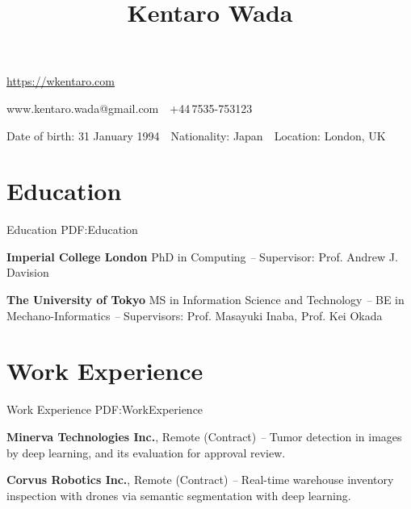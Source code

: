 \documentclass[letterpaper,MMMyyyy,nonstop]{simpleresumecv}
\newcommand{\CVAuthor}{Kentaro Wada}
\newcommand{\CVWebpage}{\href{https://wkentaro.com}{\underline{https://wkentaro.com}}}
\begin{document}

\title{\CVAuthor}

\begin{subtitle}
\CVWebpage
\par
www.kentaro.wada@gmail.com
\,\SubBulletSymbol\,
+44\,7535-753123
\par
Date of birth: 31 January 1994
\,\SubBulletSymbol\,
Nationality: Japan
\,\SubBulletSymbol\,
Location: London, UK

\noindent\makebox[\linewidth]{\rule{0.8\paperwidth}{0.4pt}}
\end{subtitle}

\begin{body}


\section
{Education}
{Education}
{PDF:Education}

\textbf{Imperial College London}
\newline
PhD in Computing
\hfill
{\it {} -- }
\newline
Supervisor: Prof. Andrew J. Davision

\GapNoBreak

\textbf{The University of Tokyo}
\newline
MS in Information Science and Technology
\hfill
{\it {} -- }
\newline
BE in Mechano-Informatics
\hfill
{\it {} -- }
\newline
Supervisors: Prof. Masayuki Inaba, Prof. Kei Okada



\section
{Work Experience}
{Work Experience}
{PDF:WorkExperience}

\textbf{Minerva Technologies Inc.}, Remote (Contract)
\hfill
\textit{ -- }
\newline
Tumor detection in images by deep learning, and its evaluation for approval review.

\textbf{Corvus Robotics Inc.}, Remote (Contract)
\hfill
\textit{ -- }
\newline
Real-time warehouse inventory inspection with drones via semantic segmentation with deep learning.


\end{body}
\end{document}
